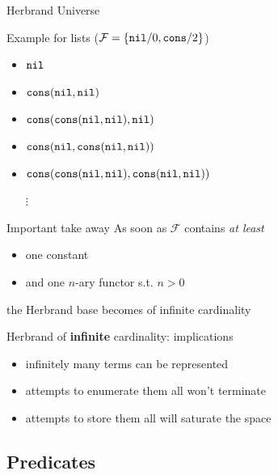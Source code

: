 \documentclass[presentation]{beamer}\mode<presentation>{\usetheme{AMSBolognaFC}}
\begin{document}
\begin{frame}[allowframebreaks]{Herbrand Universe}
    \begin{exampleblock}{Example for lists ($\mathcal{F} = \{ \mathtt{nil}/0, \mathtt{cons}/2 \}$)}
        \begin{itemize}
            \item $\mathtt{nil}$
            \item $\mathtt{cons}(\mathtt{nil}, \mathtt{nil})$
            \item $\mathtt{cons}(\mathtt{cons}(\mathtt{nil}, \mathtt{nil}), \mathtt{nil})$
            \item $\mathtt{cons}(\mathtt{nil}, \mathtt{cons}(\mathtt{nil}, \mathtt{nil}))$
            \item $\mathtt{cons}(\mathtt{cons}(\mathtt{nil}, \mathtt{nil}), \mathtt{cons}(\mathtt{nil}, \mathtt{nil}))$
            \item[$\vdots$]
        \end{itemize}
    \end{exampleblock}

    \begin{alertblock}{Important take away}
        As soon as $\mathcal{F}$ contains \emph{at least}
        \begin{itemize}
            \item one constant
            \item and one $n$-ary functor s.t. $n>0$
        \end{itemize}
        the Herbrand base becomes of \alert{infinite} cardinality
    \end{alertblock}

    \begin{block}{Herbrand of \textbf{infinite} cardinality: implications}
        \begin{itemize}
            \item infinitely many terms can be represented
            \item attempts to enumerate them all won't terminate
            \item attempts to store them all will saturate the space
        \end{itemize}
    \end{block}
\end{frame}

\subsection{Predicates}
\end{document}

